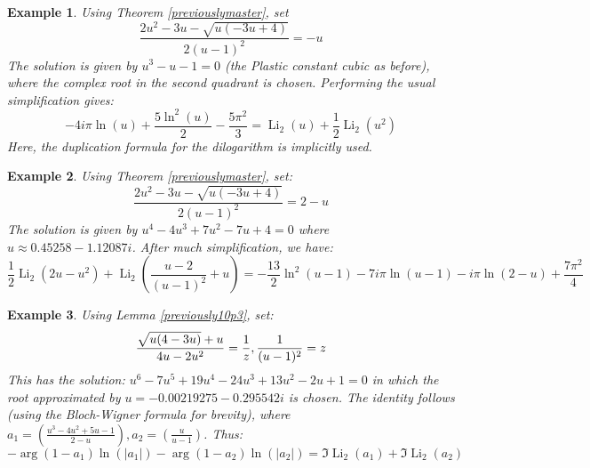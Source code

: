 \documentclass[12pt]{article}
\newtheorem{example}{Example}
\begin{document}
\begin{example}
 Using Theorem \ref{previouslymaster}, set 
\begin{equation*}
 \frac{2 u^2 - 3 u - \sqrt{u (-3 u + 4)}}{2 (u - 1)^2} = -u 
\end{equation*}
  The solution is given by $u^3-u-1=0$ (the Plastic constant cubic as before), where the complex root in the second   quadrant is chosen.  
 Performing the usual simplification gives:  
\begin{equation*}
  -4i \pi \ln(u) + \frac{5 \ln^2(u)}{2} - \frac{5\pi^2}{3} = \operatorname{Li}_2(u) + \frac{1}{2} \operatorname{Li}_2(u^2)  
\end{equation*}
  Here, the duplication formula for the dilogarithm is implicitly used.  
\end{example}

\begin{example}
 Using Theorem \ref{previouslymaster}, set:
 \begin{equation*}
\frac{2 u^2 - 3 u - \sqrt{u (-3 u + 4)}}{2 (u - 1)^2} = 2 - u
\end{equation*}
 The solution is given by 
 $u^4 - 4 u^3 + 7 u^2 - 7 u +4=0$ where $u\approx0.45258 - 1.12087 i$. After much simplification, we have:
\begin{equation*}
 \frac{1}{2} \operatorname{Li}_2(2u - u^2) + \operatorname{Li}_2\left(\frac{u - 2}{(u - 1)^2} + u\right) = -\frac{13}{2} \ln^2(u - 1) - 7 i \pi \ln(u - 1) - i \pi \ln(2 - u) + \frac{7\pi^2}{4}
\end{equation*}
\end{example}

\begin{example}
 Using Lemma \ref{previously10p3}, set: 
\begin{equation*}
 \displaystyle \frac{\sqrt{u(4 - 3u)} + u}{4u - 2u^2} = \frac{1}{z}, \\[10pt] 
 \displaystyle \frac{1}{(u - 1)^2} = z 
\end{equation*}
 This has the solution: $u^6 - 7 u^5 + 19 u^4 - 24 u^3 + 13 u^2 - 2 u + 1=0$ in which the root approximated 
 by $u= -0.00219275 - 0.295542i$ is chosen. The identity follows (using the Bloch-Wigner formula for brevity), 
 where $a_1=\left(\frac{u^3 - 4u^2 + 5u - 1}{2 - u}\right), a_2=\left(\frac{u}{u - 1}\right)$. Thus: 
\begin{equation*}
 -\arg(1-a_1)\ln(|a_1|)-\arg(1-a_2)\ln(|a_2|)=\Im\operatorname{Li}_2(a_1) + \Im\operatorname{Li}_2(a_2)
\end{equation*}
\end{example}
\end{document}
